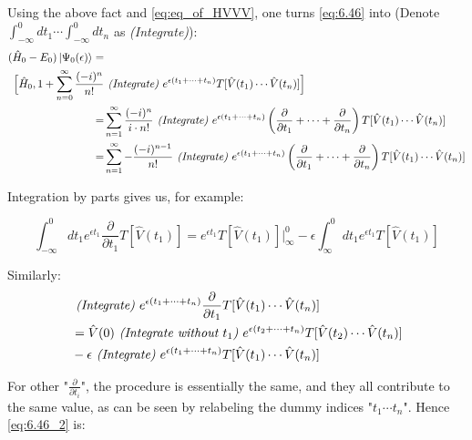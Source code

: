 \documentclass{article}
\numberwithin{equation}{subsection} %
\begin{document}
Using the above fact and \ref*{eq:eq_of_HVVV}, one turns \ref*{eq:6.46} into (Denote $\int_{-\infty}^{0} dt_1\dotsb \int_{-\infty}^{0} dt_n$ as \textit{(Integrate)}):
\begin{align}
(\hat{H}_0-E_0)\ket{\Psi_0(\epsilon)} =& \nonumber\\
\Bigl[ 
\hat{H}_0, 1+\sum_{n=0}^{\infty} \frac{(-i)^n}{n!} 
&\text{\textit{ (Integrate) }}
e^{\epsilon(t_1+\dotsb+t_n)} T[\hat{V}(t_1)\dotsb \hat{V}(t_n)]
\Bigr] \nonumber\\
=& \sum_{n=1}^{\infty} \frac{(-i)^n}{i\cdot n!} 
\text{\textit{ (Integrate) }}
e^{\epsilon(t_1+\dotsb+t_n)} 
\left( \frac{\partial}{\partial t_1} + \dotsb + \frac{\partial}{\partial t_n}  \right) 
T[\hat{V}(t_1)\dotsb \hat{V}(t_n)] \nonumber\\
=& \sum_{n=1}^{\infty} - \frac{(-i)^{n-1}}{n!} 
\text{\textit{ (Integrate) }}
e^{\epsilon(t_1+\dotsb+t_n)}
\left( \frac{\partial}{\partial t_1} + \dotsb + \frac{\partial}{\partial t_n}  \right)
T[\hat{V}(t_1)\dotsb \hat{V}(t_n)]
\label{eq:6.46_2}
\end{align}

Integration by parts gives us, for example:

$$\int_{-\infty}^{0} dt_1 e^{\epsilon t_1} \frac{\partial}{\partial t_1} T[\hat{V}(t_1)] 
= 
e^{\epsilon t_1} T[\hat{V}(t_1)] \bigg|_{\infty}^0 - \epsilon\int_{\infty}^{0} dt_1 e^{\epsilon t_1}T[\hat{V}(t_1)]$$

Similarly:
\begin{align}
&\text{\textit{ (Integrate) }}
e^{\epsilon(t_1+\dotsb+t_n)}
\frac{\partial}{\partial t_1}
T[\hat{V}(t_1)\dotsb \hat{V}(t_n)] \nonumber \\
&= \hat{V}(0) \text{\textit{ (Integrate without $t_1$) }} 	e^{\epsilon(t_2+\dotsb+t_n)}
T[\hat{V}(t_2)\dotsb \hat{V}(t_n)] \nonumber \\
&- \epsilon \text{\textit{ (Integrate) }}
e^{\epsilon(t_1+\dotsb+t_n)}
T[\hat{V}(t_1)\dotsb \hat{V}(t_n)]
\end{align}

For other "$\frac{\partial}{\partial t_i}$", the procedure is essentially the same, and they all contribute to the same value, as can be seen by relabeling the dummy indices "$t_1 \dotsb t_n$". Hence \ref{eq:6.46_2} is:
\end{document}
